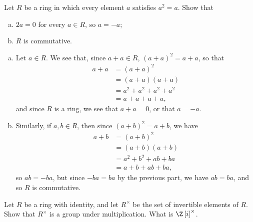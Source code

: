 \documentclass[10pt]{mypackage}
\begin{document}
\RaggedRight
\begin{problem}[Problem 1]
  Let $R$ be a ring in which every element $a$ satisfies $a^2 = a$. Show that
  \begin{enumerate}[(a)]
    \item $2a = 0$ for every $a\in R$, so $a = -a$;
    \item $R$ is commutative.
  \end{enumerate}
\end{problem}
\begin{solution}\hfill
  \begin{enumerate}[(a)]
    \item Let $a\in R$. We see that, since $a+a\in R$, $\left( a+a \right)^{2} = a+a$, so that
      \begin{align*}
        a+a &= \left( a+a \right)^2\\
            &= \left( a+a \right)\left( a+a \right)\\
            &= a^2 + a^2 + a^2 + a^2\\
            &= a + a + a + a,
      \end{align*}
      and since $R$ is a ring, we see that $a+a = 0$, or that $a = -a$.
    \item Similarly, if $a,b\in R$, then since $\left( a+b \right)^2 = a+b$, we have
      \begin{align*}
        a+b &= \left( a+b \right)^2\\
            &= \left( a+b \right)\left( a+b \right)\\
            &= a^2 + b^2 + ab + ba\\
            &= a + b + ab + ba,
      \end{align*}
      so $ab = -ba$, but since $-ba = ba$ by the previous part, we have $ab = ba$, and so $R$ is commutative.
  \end{enumerate}
\end{solution}
\begin{problem}[Problem 2]
  Let $R$ be a ring with identity, and let $R^{\times}$ be the set of invertible elements of $R$. Show that $R^{\times}$ is a group under multiplication. What is $\Z\left[ i \right]^{\times}$.
\end{problem}
\end{document}
